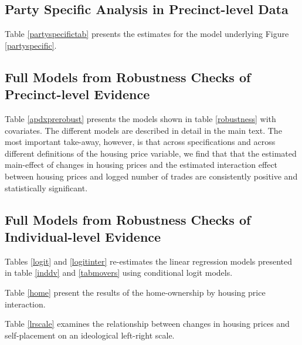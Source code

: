 \documentclass[12pt,a4paper]{article}
\begin{document}
			\newpage
			
			\subsection{Party Specific Analysis in Precinct-level Data} \label{app_partyspec}
			\setcounter{table}{0}
			
			Table \ref{partyspecifictab} presents the estimates for the model underlying Figure \ref{partyspecific}.

			
			
			
			\newpage
			
			\subsection{Full Models from Robustness Checks of Precinct-level Evidence} \label{app_robustpred}
			\setcounter{table}{0}
			
			Table \ref{apdxprerobust} presents the models shown in table \ref{robustness} with covariates. The different models are described in detail in the main text. The most important take-away, however, is that across specifications and across different definitions of the housing price variable, we find that that the estimated main-effect of changes in housing prices  and the estimated interaction effect between housing prices and logged number of trades are consistently positive and statistically significant.
			
			
			 
			
			\newpage
			
			\subsection{Full Models from Robustness Checks of Individual-level Evidence} \label{app_robustind}
			
			\setcounter{table}{0}
			
			Tables \ref{logit} and \ref{logitinter} re-estimates the linear regression models presented in table \ref{inddv} and \ref{tabmovers} using conditional logit models.
			
			Table  \ref{home} present the results of the home-ownership by housing price interaction.
			
			Table \ref{lrscale} examines the relationship between changes in housing prices and  self-placement on an ideological left-right scale.
			
			
			
			
			
			
\end{document}
